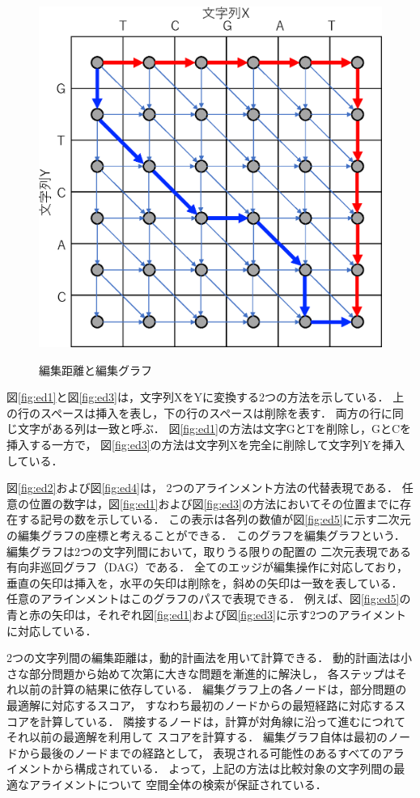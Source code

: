 \begin{figure}[t!]
\begin{center}
{\includegraphics[keepaspectratio, scale=0.5]{fig/2/ed5.eps}
\label{fig:ed5}
 }
\caption{編集距離と編集グラフ}
\label{fig:ed}
\end{center}
\end{figure}
図\ref{fig:ed1}と図\ref{fig:ed3}は，文字列XをYに変換する2つの方法を示している．
上の行のスペースは挿入を表し，下の行のスペースは削除を表す．
両方の行に同じ文字がある列は一致と呼ぶ．
図\ref{fig:ed1}の方法は文字GとTを削除し，GとCを挿入する一方で，
図\ref{fig:ed3}の方法は文字列Xを完全に削除して文字列Yを挿入している．

図\ref{fig:ed2}および図\ref{fig:ed4}は， 2つのアラインメント方法の代替表現である．
任意の位置の数字は，図\ref{fig:ed1}および図\ref{fig:ed3}の方法においてその位置までに存
在する記号の数を示している．
この表示は各列の数値が図\ref{fig:ed5}に示す二次元の編集グラフの座標と考えることができる．
このグラフを編集グラフという．
編集グラフは2つの文字列間において，取りうる限りの配置の
二次元表現である有向非巡回グラフ（DAG）である．
全てのエッジが編集操作に対応しており，垂直の矢印は挿入を，水平の矢印は削除を，斜めの矢印は一致を表している．
任意のアラインメントはこのグラフのパスで表現できる．
例えば、図\ref{fig:ed5}の青と赤の矢印は，それぞれ図\ref{fig:ed1}および図\ref{fig:ed3}に示す2つのアライメントに対応している．

2つの文字列間の編集距離は，動的計画法を用いて計算できる．
動的計画法は小さな部分問題から始めて次第に大きな問題を漸進的に解決し，
各ステップはそれ以前の計算の結果に依存している．
編集グラフ上の各ノードは，部分問題の最適解に対応するスコア，
すなわち最初のノードからの最短経路に対応するスコアを計算している．
隣接するノードは，計算が対角線に沿って進むにつれてそれ以前の最適解を利用して
スコアを計算する．
編集グラフ自体は最初のノードから最後のノードまでの経路として，
表現される可能性のあるすべてのアライメントから構成されている．
よって，上記の方法は比較対象の文字列間の最適なアライメントについて
空間全体の検索が保証されている．

